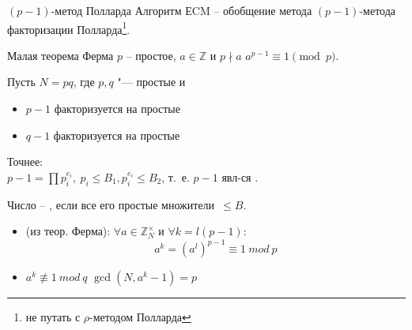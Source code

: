 \documentclass{beamer}
\begin{document}
\begin{frame}{$(p-1)$-метод Полларда}
    Алгоритм ЕCM -- обобщение метода $(p-1)$-метода факторизации Полларда\footnote{не путать с $\rho$-методом Полларда}.

    \vspace{1em}
    \begin{block}{Малая теорема Ферма}
        $p$ -- простое, $a \in \mathbb{Z}$ и $p \nmid a$ \MyImplies $a^{p-1} \equiv 1 \pmod{p}$.
    \end{block}    
\end{frame}

\begin{frame}%
Пусть $N = p q$, где $p, q$ "--- простые и
\begin{itemize}
  \item $p-1$ факторизуется на  простые\\
  \item $q-1$  факторизуется на  простые
\end{itemize}

\vspace{1em}
Точнее:\\
$p-1 = \prod p_i^{e_i},\ p_i \leq B_1, p_i^{e_i} \leq B_2$, т.~е. $p-1$ явл-ся .

\vspace{1em}
Число -- , если все его простые множители~$\leq B$.


\vspace{1em}
\begin{itemize}
    \item (из теор. Ферма): $\forall a \in \mathbb{Z}_N^\times$ и $\forall k = l (p-1)$:
    \[
    a^k = (a^l)^{p-1} \equiv 1\ mod\ p
    \]
    \item $a^k \not\equiv 1\ mod\ q$ \structure{$\implies$} $\gcd(N, a^k - 1) = p$
\end{itemize}
\end{frame}
\end{document}
